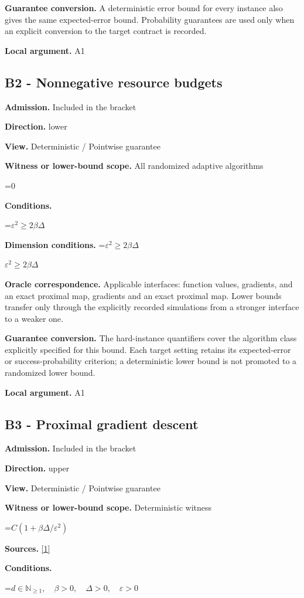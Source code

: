 \documentclass[10pt,a4paper]{article}
\newcommand{\AtlasMath}[1]{\par\begingroup\centering\setbox0=\hbox{$\displaystyle #1$}\ifdim\wd0>1.4\linewidth\typeout{ATLAS WIDE FORMULA: \the\wd0}\fi\ifdim\wd0>\linewidth\resizebox{\linewidth}{!}{\box0}\else\box0\fi\par\endgroup}
\newcommand{\AtlasInlineMath}[1]{\begingroup\setbox0=\hbox{$#1$}\ifdim\wd0>.4\linewidth\endgroup\AtlasMath{#1}\else\endgroup$#1$\fi}
\begin{document}
\textbf{Guarantee conversion.} A deterministic error bound for every instance also gives the same expected-error bound. Probability guarantees are used only when an explicit conversion to the target contract is recorded.

\textbf{Local argument.} A1

\subsection{B2 - Nonnegative resource budgets}
\textbf{Admission.} Included in the bracket

\textbf{Direction.} lower

\textbf{View.} Deterministic / Pointwise guarantee

\textbf{Witness or lower-bound scope.} All randomized adaptive algorithms

\AtlasMath{0}
\textbf{Conditions.} 
\AtlasMath{\varepsilon^2\ge2\beta\Delta}


\textbf{Dimension conditions.} \AtlasInlineMath{\varepsilon^2\ge2\beta\Delta}

\textbf{Oracle correspondence.} Applicable interfaces: function values, gradients, and an exact proximal map, gradients and an exact proximal map. Lower bounds transfer only through the explicitly recorded simulations from a stronger interface to a weaker one.

\textbf{Guarantee conversion.} The hard-instance quantifiers cover the algorithm class explicitly specified for this bound. Each target setting retains its expected-error or success-probability criterion; a deterministic lower bound is not promoted to a randomized lower bound.

\textbf{Local argument.} A1

\subsection{B3 - Proximal gradient descent}
\textbf{Admission.} Included in the bracket

\textbf{Direction.} upper

\textbf{View.} Deterministic / Pointwise guarantee

\textbf{Witness or lower-bound scope.} Deterministic witness

\AtlasMath{C(1+\beta\Delta/\varepsilon^2)}
\textbf{Sources.} \href{https://arxiv.org/pdf/1308.6594}{[1]}

\textbf{Conditions.} 
\AtlasMath{d\in\mathbb{N}_{\ge1},\quad \beta>0,\quad \Delta>0,\quad \varepsilon>0}
\end{document}

